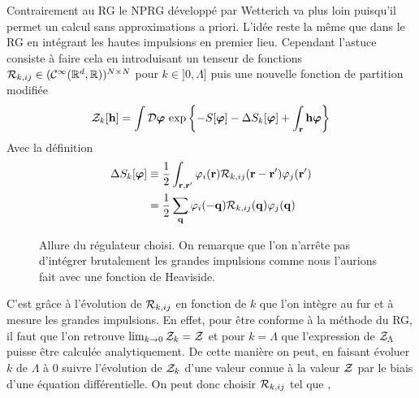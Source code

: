 \documentclass[10pt]{article}
\begin{document}
\begin{multicols}{2}
Contrairement au RG le NPRG développé par Wetterich \cite{wetterich} va plus loin puisqu'il permet un calcul sans approximations a priori. L'idée reste la même que dans le RG en intégrant les hautes impulsions en  premier lieu. Cependant l'astuce consiste à faire cela en introduisant un tenseur de fonctions $\mathcal{R}_{k, ij} \in (\mathcal{C}^\infty(\mathbb{R}^{d},\mathbb{R}))^{N\times N}$ pour $k \in ]0, \Lambda]$ puis une nouvelle fonction de partition modifiée  
\begin{equation}
  \mathcal{Z}_k[{\bf h}] = \int \mathcal{D} \boldsymbol{ \varphi} \, \exp\left\{-S[\boldsymbol{ \varphi}] - \Delta S_k[\boldsymbol{ \varphi}] + \int_{{\bf r}} {\bf h} \boldsymbol{ \varphi} \right\} 
\end{equation}
Avec la définition
\begin{equation}
  \begin{split}
  \Delta S_k[\boldsymbol{ \varphi}]  & \equiv \frac{1}{2} \int_{{\bf r}, {\bf r}'} \varphi_i({\bf r}) \mathcal{R}_{k,ij}({\bf r} - {\bf r}') \varphi_j({\bf r}') \\
 & =  \frac{1}{2} \sum_{{\bf q}} \varphi_i(-{\bf q}) \mathcal{R}_{k,ij}({\bf q}) \varphi_j({\bf q})
\end{split}
\end{equation}

\begin{figure}[H]
\begin{center}
\end{center}
\caption{Allure du régulateur choisi. On remarque que l'on n'arrête pas d'intégrer brutalement les grandes impulsions comme nous l'aurions fait avec une fonction de Heaviside. }
\end{figure}

C'est grâce à l'évolution de $\mathcal{R}_{k,ij}$ en fonction de $k$ que l'on intègre au fur et à mesure les grandes impulsions. En effet, pour être conforme à la méthode du RG, il faut que l'on retrouve $\lim_{k \to 0}\mathcal{Z}_k = \mathcal{Z}$ et pour $k = \Lambda$ que l'expression de $\mathcal{Z}_\Lambda$ puisse être calculée analytiquement. De cette manière on peut, en faisant évoluer $k$ de $\Lambda$ à $0$ suivre l'évolution de $\mathcal{Z}_k$ d'une valeur connue à la valeur $\mathcal{Z}$ par le biais d'une équation différentielle. On peut donc choisir $\mathcal{R}_{k,ij}$ tel que , \\


\end{multicols}
\end{document}
